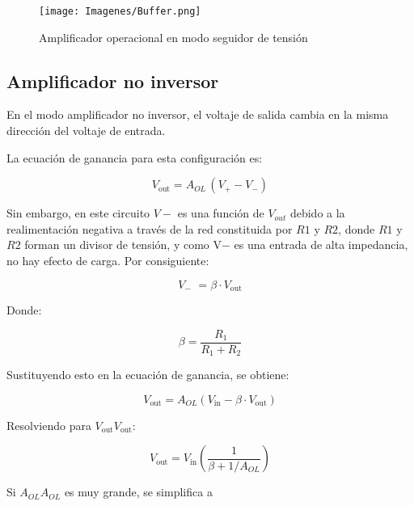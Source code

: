 \documentclass{article}
\begin{document}
\begin{figure}[h!]
    \centering
    \texttt{[image: Imagenes/Buffer.png]}
    \caption{Amplificador operacional en modo seguidor de tensión \citep{AmplificadorOperacional}}
    \label{fig:buffer}
\end{figure}

\subsection{Amplificador no inversor}

En el modo amplificador no inversor, el voltaje de salida cambia en la misma dirección del voltaje de entrada.\citep{AmplificadorOperacional}

La ecuación de ganancia para esta configuración es:

\begin{equation}
    {\displaystyle V_{\text{out}}=A_{OL}\,(V_{\!+}-V_{\!-})} 
\end{equation}

Sin embargo, en este circuito $V−$ es una función de $V_{out}$ debido a la realimentación negativa a través de la red constituida por $R1$ y $R2$, donde $R1$ y 
$R2$ forman un divisor de tensión, y como V− es una entrada de alta impedancia, no hay efecto de carga. Por consiguiente:

\begin{equation}
    {\displaystyle V_{\!-}\,\,=\beta \cdot V_{\text{out}}} 
\end{equation}


Donde:

\begin{equation}
{\displaystyle \beta ={\frac {R_{1}}{R_{1}+R_{2}}}}
\end{equation}

Sustituyendo esto en la ecuación de ganancia, se obtiene:


\begin{equation}
{\displaystyle V_{\text{out}}=A_{OL}(V_{\text{in}}-\beta \cdot V_{\text{out}})}
\end{equation}


Resolviendo para ${\displaystyle V_{\text{out}}} {\displaystyle V_{\text{out}}}:$

\begin{equation}
{\displaystyle V_{\text{out}}=V_{\text{in}}\left({\frac {1}{\beta +1/A_{OL}}}\right)} 
\end{equation}


Si ${\displaystyle A_{OL}} {\displaystyle A_{OL}}$ es muy grande, se simplifica a
\end{document}
